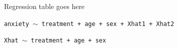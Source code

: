 \documentclass[aspectratio=169]{beamer}
\theoremstyle{remark}
\begin{document}
\begin{frame}{Regression table goes here}

    \texttt{anxiety $\sim$ treatment + age + sex + Xhat1 + Xhat2}

    \texttt{Xhat $\sim$ treatment + age + sex}

\end{frame}











\end{document}
